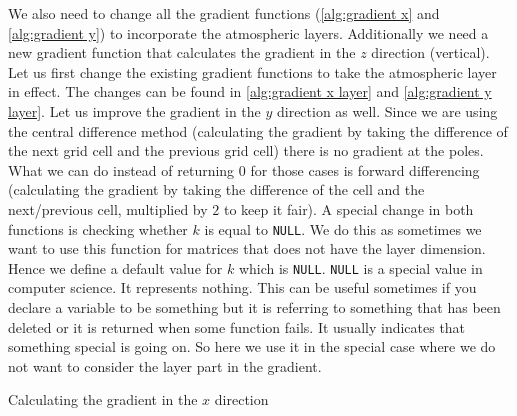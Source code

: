 We also need to change all the gradient functions (\autoref{alg:gradient x} and \autoref{alg:gradient y}) to incorporate the atmospheric layers. Additionally we need a new gradient function that 
calculates the gradient in the $z$ direction (vertical). Let us first change the existing gradient functions to take the atmospheric layer in effect. The changes can be found in 
\autoref{alg:gradient x layer} and \autoref{alg:gradient y layer}. Let us improve the gradient in the $y$ direction as well. Since we are using the central difference method (calculating the
gradient by taking the difference of the next grid cell and the previous grid cell) there is no gradient at the poles. What we can do instead of returning $0$ for those cases is forward 
differencing (calculating the gradient by taking the difference of the cell and the next/previous cell, multiplied by $2$ to keep it fair). A special change in both functions is checking whether
$k$ is equal to \texttt{NULL}. We do this as sometimes we want to use this function for matrices that does not have the layer dimension. Hence we define a default value for $k$ which is 
\texttt{NULL}. \texttt{NULL} is a special value in computer science. It represents nothing. This can be useful sometimes if you declare a variable to be something but it is referring to something
that has been deleted or it is returned when some function fails. It usually indicates that something special is going on. So here we use it in the special case where we do not want to consider
the layer part in the gradient.

\begin{algorithm}[hbt]
     \;
    \caption{Calculating the gradient in the $x$ direction}
    \label{alg:gradient x layer}
\end{algorithm}

